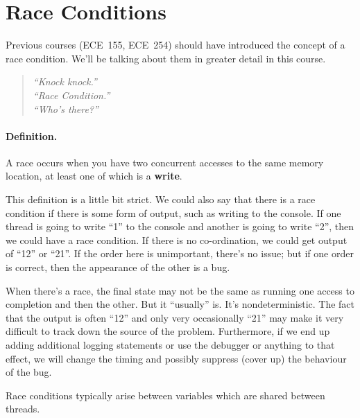 





\section*{Race Conditions}
Previous courses (ECE~155, ECE~254) should have introduced the concept of a race condition. We'll be talking about them in greater detail in this course.

\begin{quote}
\textit{
	``Knock knock.''\\
	``Race Condition.''\\
	``Who's there?''
	}
\end{quote}

\paragraph{Definition.} A race occurs when you have two concurrent accesses to the
same memory location, at least one of which is a {\bf write}.

This definition is a little bit strict. We could also say that there is a race condition if there is some form of output, such as writing to the console. If one thread is going to write ``1'' to the console and another is going to write ``2'', then we could have a race condition. If there is no co-ordination, we could get output of ``12'' or ``21''. If the order here is unimportant, there's no issue; but if one order is correct, then the appearance of the other is a bug.

When there's a race, the final state may not be the same as running
one access to completion and then the other. But it ``usually'' is. It's nondeterministic. The fact that the output is often ``12'' and only very occasionally ``21'' may make it very difficult to track down the source of the problem. Furthermore, if we end up adding additional logging statements or use the debugger or anything to that effect, we will change the timing and possibly suppress (cover up) the behaviour of the bug.




Race conditions typically arise between variables which are shared
between threads.

